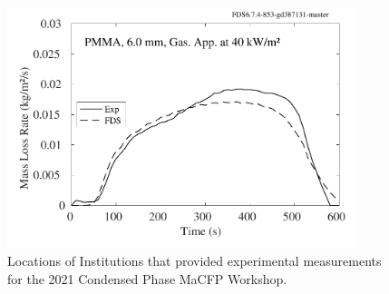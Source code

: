 \documentclass{book}
\begin{document}
\begin{figure}
  \centering
  \includegraphics[width=4in]{SCRIPT_FIGURES/PMMA_40}
  \caption{Locations of Institutions that provided experimental measurements for the 2021 Condensed Phase MaCFP Workshop.}
  \label{Fig_1}
\end{figure}
\end{document}
